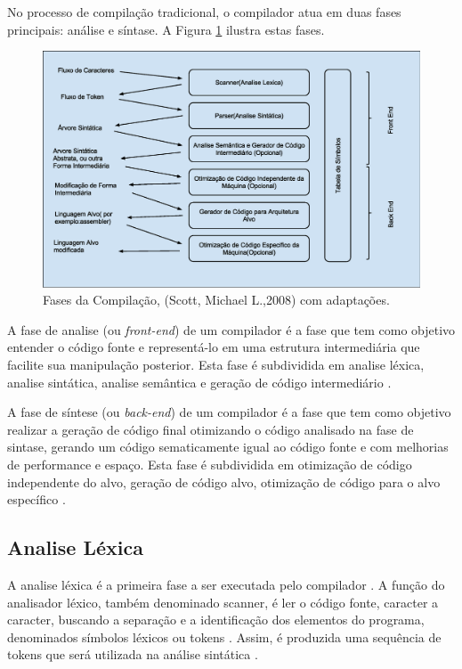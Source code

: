 No processo de compilação tradicional, o compilador atua em duas fases 
principais: análise e síntase\cite{ref12}\cite{ref13}. A Figura \ref{fig01}
 ilustra estas fases. 

\begin{figure}[h]
    \centering
        \includegraphics[keepaspectratio=true,scale=0.5]{figuras/fases_da_compilacao.eps}
    \caption{Fases da Compilação, (Scott, Michael L.,2008)  com adaptações.}
    \label{fig01}
\end{figure}

A fase de analise (ou \textit{front-end}) de um compilador é a fase que 
tem como objetivo entender o código fonte e  representá-lo em uma 
estrutura intermediária que facilite sua manipulação posterior. 
Esta fase é subdividida em analise léxica, analise sintática, 
analise semântica e geração de código intermediário \cite{ref14}.

A fase de síntese (ou \textit{back-end}) de um compilador é a fase que tem 
como objetivo realizar a geração de código final otimizando o código 
analisado na fase de sintase, gerando um código sematicamente igual ao 
código fonte e com melhorias de performance e espaço. Esta fase é 
subdividida em otimização de código independente do alvo, geração de 
código alvo, otimização de código  para o alvo específico \cite{ref14}.


\subsection{Analise Léxica}
    
A analise léxica é a primeira fase a ser executada pelo compilador \cite{ref15}. 
A função do analisador léxico, também denominado scanner, é ler o código fonte, 
caracter a caracter, buscando a separação e  a identificação dos elementos do 
programa, denominados símbolos léxicos ou tokens \cite{ref16}. Assim, é 
produzida uma sequência de tokens que será utilizada na análise sintática \cite{ref17}. 

